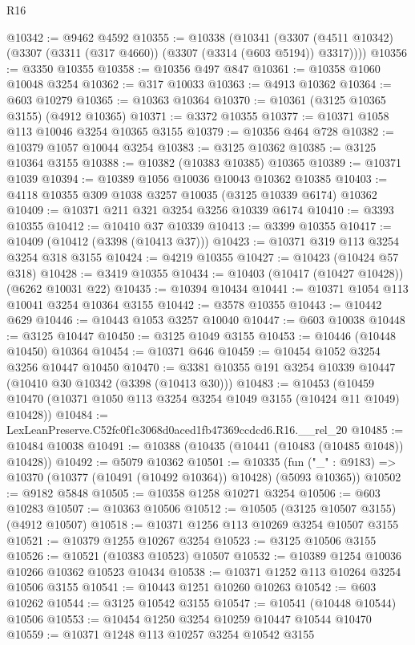 \begin{lexlean}{R16}
\begin{coremodule}
@10342 := @9462 @4592
@10355 := @10338
    (@10341 (@3307 (@4511 @10342) (@3307 (@3311 (@317 @4660)) (@3307 (@3314 (@603 @5194)) @3317))))
@10356 := @3350 @10355
@10358 := @10356 @497 @847
@10361 := @10358 @1060 @10048 @3254
@10362 := @317 @10033
@10363 := @4913 @10362
@10364 := @603 @10279
@10365 := @10363 @10364
@10370 := @10361 (@3125 @10365 @3155) (@4912 @10365)
@10371 := @3372 @10355
@10377 := @10371 @1058 @113 @10046 @3254 @10365 @3155
@10379 := @10356 @464 @728
@10382 := @10379 @1057 @10044 @3254
@10383 := @3125 @10362
@10385 := @3125 @10364 @3155
@10388 := @10382 (@10383 @10385) @10365
@10389 := @10371 @1039
@10394 := @10389 @1056 @10036 @10043 @10362 @10385
@10403 := @4118 @10355 @309 @1038 @3257 @10035 (@3125 @10339 @6174) @10362
@10409 := @10371 @211 @321 @3254 @3256 @10339 @6174
@10410 := @3393 @10355
@10412 := @10410 @37 @10339
@10413 := @3399 @10355
@10417 := @10409 (@10412 (@3398 (@10413 @37)))
@10423 := @10371 @319 @113 @3254 @3254 @318 @3155
@10424 := @4219 @10355
@10427 := @10423 (@10424 @57 @318)
@10428 := @3419 @10355
@10434 := @10403 (@10417 (@10427 @10428)) (@6262 @10031 @22)
@10435 := @10394 @10434
@10441 := @10371 @1054 @113 @10041 @3254 @10364 @3155
@10442 := @3578 @10355
@10443 := @10442 @629
@10446 := @10443 @1053 @3257 @10040
@10447 := @603 @10038
@10448 := @3125 @10447
@10450 := @3125 @1049 @3155
@10453 := @10446 (@10448 @10450) @10364
@10454 := @10371 @646
@10459 := @10454 @1052 @3254 @3256 @10447 @10450
@10470 := @3381 @10355 @191 @3254 @10339 @10447 (@10410 @30 @10342 (@3398 (@10413 @30)))
@10483 := @10453
    (@10459 @10470 (@10371 @1050 @113 @3254 @3254 @1049 @3155 (@10424 @11 @1049) @10428))
@10484 := LexLeanPreserve.C52fc0f1c3068d0aced1fb47369ccdcd6.R16.__rel_20
@10485 := @10484 @10038
@10491 := @10388 (@10435 (@10441 (@10483 (@10485 @1048)) @10428))
@10492 := @5079 @10362
@10501 := @10335
    (fun ("_" : @9183) => @10370 (@10377 (@10491 (@10492 @10364)) @10428) (@5093 @10365))
@10502 := @9182 @5848
@10505 := @10358 @1258 @10271 @3254
@10506 := @603 @10283
@10507 := @10363 @10506
@10512 := @10505 (@3125 @10507 @3155) (@4912 @10507)
@10518 := @10371 @1256 @113 @10269 @3254 @10507 @3155
@10521 := @10379 @1255 @10267 @3254
@10523 := @3125 @10506 @3155
@10526 := @10521 (@10383 @10523) @10507
@10532 := @10389 @1254 @10036 @10266 @10362 @10523 @10434
@10538 := @10371 @1252 @113 @10264 @3254 @10506 @3155
@10541 := @10443 @1251 @10260 @10263
@10542 := @603 @10262
@10544 := @3125 @10542 @3155
@10547 := @10541 (@10448 @10544) @10506
@10553 := @10454 @1250 @3254 @10259 @10447 @10544 @10470
@10559 := @10371 @1248 @113 @10257 @3254 @10542 @3155

\end{coremodule}
\end{lexlean}
